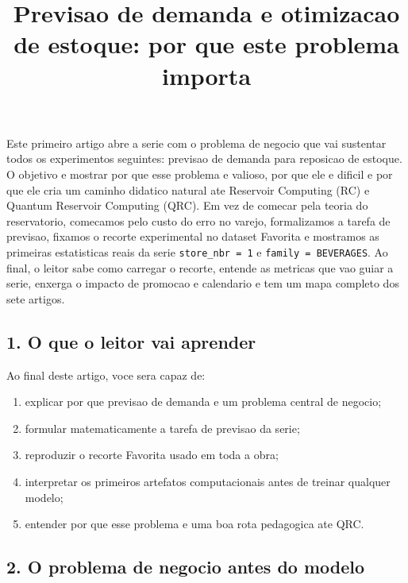 \documentclass[12pt]{article}
\title{Previsao de demanda e otimizacao de estoque: por que este problema importa}
\author{}
\providecommand{\tightlist}{%
          \setlength{\itemsep}{0pt}\setlength{\parskip}{0pt}}
\begin{document}
        \maketitle

        \begin{resumo}
        Este primeiro artigo abre a serie com o problema de negocio que vai sustentar todos os experimentos seguintes: previsao de demanda para reposicao de estoque. O objetivo e mostrar por que esse problema e valioso, por que ele e dificil e por que ele cria um caminho didatico natural ate Reservoir Computing (RC) e Quantum Reservoir Computing (QRC). Em vez de comecar pela teoria do reservatorio, comecamos pelo custo do erro no varejo, formalizamos a tarefa de previsao, fixamos o recorte experimental no dataset Favorita e mostramos as primeiras estatisticas reais da serie \texttt{store\_nbr\ =\ 1} e \texttt{family\ =\ BEVERAGES}. Ao final, o leitor sabe como carregar o recorte, entende as metricas que vao guiar a serie, enxerga o impacto de promocao e calendario e tem um mapa completo dos sete artigos.
        \end{resumo}

        \subsection{1. O que o leitor vai aprender}\label{1-o-que-o-leitor-vai-aprender}

Ao final deste artigo, voce sera capaz de:

\begin{enumerate}
\def\labelenumi{\arabic{enumi}.}
\tightlist
\item
  explicar por que previsao de demanda e um problema central de negocio;
\item
  formular matematicamente a tarefa de previsao da serie;
\item
  reproduzir o recorte Favorita usado em toda a obra;
\item
  interpretar os primeiros artefatos computacionais antes de treinar qualquer modelo;
\item
  entender por que esse problema e uma boa rota pedagogica ate QRC.
\end{enumerate}

\subsection{2. O problema de negocio antes do modelo}\label{2-o-problema-de-negocio-antes-do-modelo}
\end{document}
